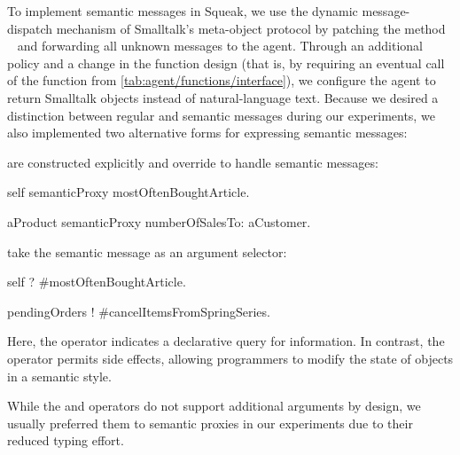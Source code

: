 To implement semantic messages in Squeak, we use the dynamic message-dispatch mechanism of Smalltalk's meta-object protocol by patching the method ~\cite[sec.~5.11]{ingalls2020evolution} and forwarding all unknown messages to the agent.
Through an additional policy and a change in the function design (that is, by requiring an eventual call of the  function from \cref{tab:agent/functions/interface}), we configure the agent to return Smalltalk objects instead of natural-language text.
Because we desired a distinction between regular and semantic messages during our experiments, we also implemented two alternative forms for expressing semantic messages:
\begin{description}[noextralabelsep]
	\item[Semantic proxies] are constructed explicitly and override  to handle semantic messages:
	\begin{multicode}
		self semanticProxy mostOftenBoughtArticle.

		aProduct semanticProxy numberOfSalesTo: aCustomer.
	\end{multicode}
	\item[The \code{?} and \code{!} operators] take the semantic message as an argument selector:
	\begin{multicode}
		self ? \#mostOftenBoughtArticle.

		pendingOrders ! \#cancelItemsFromSpringSeries.
	\end{multicode}
	Here, the  operator indicates a declarative query for information.
	In contrast, the \code{!} operator permits side effects, allowing programmers to modify the state of objects in a semantic style.
\end{description}
While the  and \code{!} operators do not support additional arguments by design, we usually preferred them to semantic proxies in our experiments due to their reduced typing effort.
